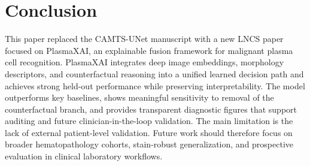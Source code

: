 \documentclass[runningheads]{llncs}
\begin{document}
\section{Conclusion}
This paper replaced the CAMTS-UNet manuscript with a new LNCS paper focused on PlasmaXAI, an explainable fusion framework for malignant plasma cell recognition. PlasmaXAI integrates deep image embeddings, morphology descriptors, and counterfactual reasoning into a unified learned decision path and achieves strong held-out performance while preserving interpretability. The model outperforms key baselines, shows meaningful sensitivity to removal of the counterfactual branch, and provides transparent diagnostic figures that support auditing and future clinician-in-the-loop validation. The main limitation is the lack of external patient-level validation. Future work should therefore focus on broader hematopathology cohorts, stain-robust generalization, and prospective evaluation in clinical laboratory workflows.
\end{document}
